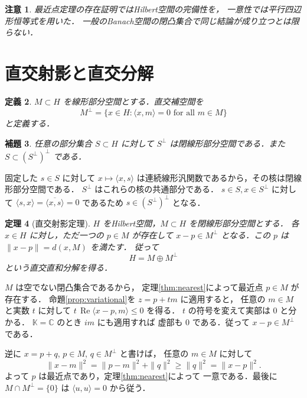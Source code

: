 \documentclass[a5paper,10pt,onecolumn]{jsarticle}
\makeatletter
\theoremstyle{mathnotetheorem}
\newtheorem{theorem}{定理}[section]
\newtheorem{definition}[theorem]{定義}
\newtheorem{lemma}[theorem]{補題}
\newtheorem{remark}[theorem]{注意}
\renewcommand{\proofname}{証明}
\renewenvironment{proof}[1][\proofname]{%
  \par\pushQED{\qed}\normalfont\topsep4\p@\@plus2\p@\relax
  \trivlist\item[\hskip\labelsep\bfseries #1]\ignorespaces
}{\popQED\endtrivlist\@endpefalse}
\makeatother
\begin{document}
\begin{remark}
最近点定理の存在証明ではHilbert空間の完備性を，
一意性では平行四辺形恒等式を用いた．
一般のBanach空間の閉凸集合で同じ結論が成り立つとは限らない．
\end{remark}

\section{直交射影と直交分解}

\begin{definition}
$M\subset H$ を線形部分空間とする．直交補空間を
\[
 M^\perp=\{x\in H:\langle x,m\rangle=0
  \text{ for all }m\in M\}
\]
と定義する．
\end{definition}

\begin{lemma}
任意の部分集合 $S\subset H$ に対して
$S^\perp$ は閉線形部分空間である．また
$S\subset(S^\perp)^\perp$ である．
\end{lemma}
\begin{proof}
固定した $s\in S$ に対して $x\mapsto\langle x,s\rangle$
は連続線形汎関数であるから，その核は閉線形部分空間である．
$S^\perp$ はこれらの核の共通部分である．
$s\in S,x\in S^\perp$ に対して
$\langle s,x\rangle=\overline{\langle x,s\rangle}=0$ であるため
$s\in(S^\perp)^\perp$ となる．
\end{proof}

\begin{theorem}[直交射影定理]\label{thm:projection}
$H$ をHilbert空間，$M\subset H$ を閉線形部分空間とする．
各 $x\in H$ に対し，ただ一つの $p\in M$ が存在して
$x-p\in M^\perp$ となる．この $p$ は
$\|x-p\|=d(x,M)$ を満たす．
従って
\[
 H=M\oplus M^\perp
\]
という直交直和分解を得る．
\end{theorem}
\begin{proof}
$M$ は空でない閉凸集合であるから，
定理\ref{thm:nearest}によって最近点 $p\in M$ が存在する．
命題\ref{prop:variational}を $z=p+tm$ に適用すると，
任意の $m\in M$ と実数 $t$ に対して
$t\,\operatorname{Re}\langle x-p,m\rangle\le0$ を得る．
$t$ の符号を変えて実部は $0$ と分かる．
$\mathbb K=\mathbb C$ のとき $im$ にも適用すれば
虚部も $0$ である．従って $x-p\in M^\perp$ である．

逆に $x=p+q$, $p\in M$, $q\in M^\perp$ と書けば，
任意の $m\in M$ に対して
\[
 \|x-m\|^2=\|p-m\|^2+\|q\|^2\ge\|q\|^2=\|x-p\|^2.
\]
よって $p$ は最近点であり，定理\ref{thm:nearest}によって
一意である．最後に $M\cap M^\perp=\{0\}$ は
$\langle u,u\rangle=0$ から従う．
\end{proof}
\end{document}
